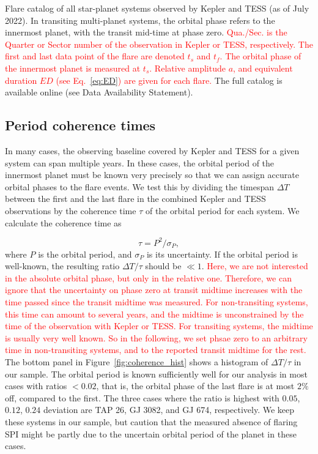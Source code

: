 \documentclass[twocolumn]{aastex631}
\begin{document}
\begin{table*}
    \centering
            \caption{
            Flare catalog of all star-planet systems observed by Kepler and TESS (as of July 2022). In transiting multi-planet systems, the orbital phase refers to the innermost planet, with the transit mid-time at phase zero. \textcolor{red}{Qua./Sec. is the Quarter or Sector number of the observation in Kepler or TESS, respectively. The first and last data point of the flare are denoted $t_s$ and $t_f$. The orbital phase of the innermost planet is measured at $t_s$. Relative amplitude $a$, and equivalent duration $ED$ (see Eq.~\ref{eq:ED}) are given for each flare.} The full catalog is available online (see Data Availability Statement).
        }
    
        \label{tab:flares}
\end{table*}

\subsection{Period coherence times}
\label{sec:results:coherence}
In many cases, the observing baseline covered by Kepler and TESS for a given system can span multiple years. In these cases, the orbital period of the innermost planet must be known very precisely so that we can assign accurate orbital phases to the flare events.
We test this by dividing the timespan $\Delta T$ between the first and the last flare in the combined Kepler and TESS observations by the coherence time $\tau$ of the orbital period for each system. We calculate the coherence time as

\begin{equation}
    \tau = P^2 / \sigma_P,
\end{equation}
where $P$ is the orbital period, and $\sigma_P$ is its uncertainty.
If the orbital period is well-known, the resulting ratio $\Delta T/\tau$ should be $\ll 1$. \textcolor{red}{Here, we are not interested in the absolute orbital phase, but only in the relative one. Therefore, we can ignore that the uncertainty on phase zero at transit midtime increases with the time passed since the transit midtime was measured. For non-transiting systems, this time can amount to several years, and the midtime is unconstrained by the time of the observation with Kepler or TESS. For transiting systems, the midtime is usually very well known. So in the following, we set phsae zero to an arbitrary time in non-transiting systems, and to the reported transit midtime for the rest.} The bottom panel in Figure~\ref{fig:coherence_hist} shows a histogram of $\Delta T/\tau$ in our sample. The orbital period is known sufficiently well for our analysis in most cases with ratios $<0.02$, that is, the orbital phase of the last flare is at most $2\%$ off, compared to the first. The three cases where the ratio is highest with $0.05$, $0.12$, $0.24$ deviation are TAP 26, GJ 3082, and GJ 674, respectively. We keep these systems in our sample, but caution that the measured absence of flaring SPI might be partly due to the uncertain orbital period of the planet in these cases.
\end{document}
